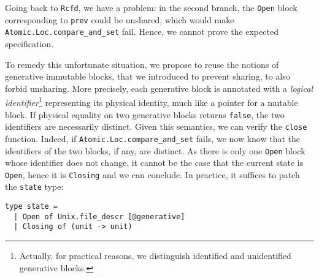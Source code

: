 Going back to \texttt{Rcfd}, we have a problem: in the second branch, the \texttt{Open} block corresponding to \texttt{prev} could be unshared, which would make \texttt{Atomic.Loc.compare_and_set} fail.
Hence, we cannot prove the expected specification.

To remedy this unfortunate situation, we propose to reuse the notions of generative immutable blocks, that we introduced to prevent sharing, to also forbid unsharing.
More precisely, each generative block is annotated with a \emph{logical identifier}\footnote{Actually, for practical reasons, we distinguish identified and unidentified generative blocks.} representing its physical identity, much like a pointer for a mutable block.
If physical equality on two generative blocks returns \texttt{false}, the two identifiers are necessarily distinct.
Given this semantics, we can verify the \texttt{close} function.
Indeed, if \texttt{Atomic.Loc.compare_and_set} fails, we now know that the identifiers of the two blocks, if any, are distinct.
As there is only one \texttt{Open} block whose identifier does not change, it cannot be the case that the current state is \texttt{Open}, hence it is \texttt{Closing} and we can conclude.
In practice, it suffices to patch the \texttt{state} type:
\begin{verbatim}
type state =
  | Open of Unix.file_descr [@generative]
  | Closing of (unit -> unit)
\end{verbatim}

